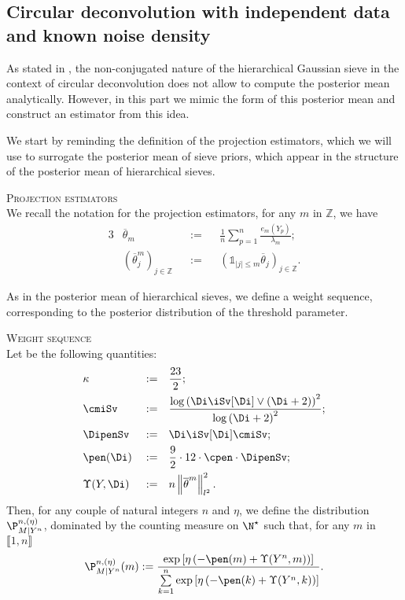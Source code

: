 \subsection{Circular deconvolution with independent data and known noise density}\label{FREQ_CIRCDECONV_KNOWN_IID}

As stated in , the non-conjugated nature of the hierarchical Gaussian sieve in the context of circular deconvolution does not allow to compute the posterior mean analytically.
However, in this part we mimic the form of this posterior mean and construct an estimator from this idea.

We start by reminding the definition of the projection estimators, which we will use to surrogate the posterior mean of sieve priors, which appear in the structure of the posterior mean of hierarchical sieves.

\begin{rem}{\textsc{Projection estimators} \\}\label{REM_FREQ_CIRCDECONV_KNOWN_IID_PROJEST}
We recall the notation for the projection estimators, for any $m$ in $\mathds{Z}$, we have
\begin{alignat*}{3}
& \overline{\theta}_{m} && := && \frac{1}{n}\sum\limits_{p = 1}^{n} \frac{e_{m}(Y_{p})}{\lambda_{m}};\\
& \left( \overline{\theta}^{m}_{j} \right)_{j \in \mathds{Z}} && := &&\left(\mathds{1}_{\vert j \vert \leq m} \overline{\theta}_{j}\right)_{j \in \mathds{Z}}.
\end{alignat*}
\end{rem}

As in the posterior mean of hierarchical sieves, we define a weight sequence, corresponding to the posterior distribution of the threshold parameter.

\begin{de}{\textsc{Weight sequence} \\}\label{DE_FREQ_CIRCDECONV_KNOWN_IID_WEIGHT}
Let be the following quantities:
\begin{alignat*}{3}
& \kappa && := && \frac{23}{2};\\
& \cmiSv && := && \frac{\log\left(\Di \iSv[\Di] \vee (\Di + 2)\right)^{2}}{\log\left(\Di + 2\right)^{2}};\\
& \DipenSv && := && \Di \iSv[\Di] \cmiSv; \\
& \pen(\Di) && := && \frac{9}{2} \cdot 12 \cdot \cpen \cdot \DipenSv;\\
& \Upsilon(Y, \Di) && := && n \left\Vert \overline{\theta}^{m} \right\Vert_{l^{2}}^{2}.
\end{alignat*}
Then, for any couple of natural integers $n$ and $\eta$, we define the distribution $\P_{M \vert Y^{n}}^{n, (\eta)}$, dominated by the counting measure on $\N^{\star}$ such that, for any $m$ in $\llbracket 1, n \rrbracket$
\[\P_{M \vert Y^{n}}^{n, (\eta)}(m) := \frac{\exp\left[\eta\left(- \pen(m) + \Upsilon(Y^{n}, m)\right)\right]}{\sum\limits_{k = 1}^{n} \exp\left[\eta\left(- \pen(k) + \Upsilon(Y^{n}, k)\right)\right]}.\]
\end{de}

